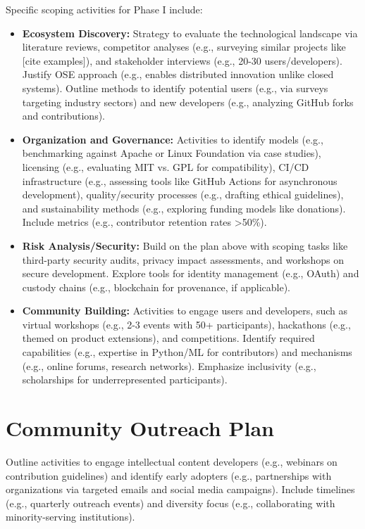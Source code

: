 \documentclass[11pt]{article}
\begin{document}
\noindent
Specific scoping activities for Phase I include:
\vspace{-3pt}
\begin{itemize}
    \item \textbf{Ecosystem Discovery:} Strategy to evaluate the technological landscape via literature reviews, competitor analyses (e.g., surveying similar projects like [cite examples]), and stakeholder interviews (e.g., 20-30 users/developers). Justify OSE approach (e.g., enables distributed innovation unlike closed systems). Outline methods to identify potential users (e.g., via surveys targeting industry sectors) and new developers (e.g., analyzing GitHub forks and contributions).
    \item \textbf{Organization and Governance:} Activities to identify models (e.g., benchmarking against Apache or Linux Foundation via case studies), licensing (e.g., evaluating MIT vs. GPL for compatibility), CI/CD infrastructure (e.g., assessing tools like GitHub Actions for asynchronous development), quality/security processes (e.g., drafting ethical guidelines), and sustainability methods (e.g., exploring funding models like donations). Include metrics (e.g., contributor retention rates >50\%).
    \item \textbf{Risk Analysis/Security:} Build on the plan above with scoping tasks like third-party security audits, privacy impact assessments, and workshops on secure development. Explore tools for identity management (e.g., OAuth) and custody chains (e.g., blockchain for provenance, if applicable).
    \item \textbf{Community Building:} Activities to engage users and developers, such as virtual workshops (e.g., 2-3 events with 50+ participants), hackathons (e.g., themed on product extensions), and competitions. Identify required capabilities (e.g., expertise in Python/ML for contributors) and mechanisms (e.g., online forums, research networks). Emphasize inclusivity (e.g., scholarships for underrepresented participants).
\end{itemize}


\section*{Community Outreach Plan}
\vspace{-3pt}
\noindent
Outline activities to engage intellectual content developers (e.g., webinars on contribution guidelines) and identify early adopters (e.g., partnerships with organizations via targeted emails and social media campaigns). Include timelines (e.g., quarterly outreach events) and diversity focus (e.g., collaborating with minority-serving institutions).
\vspace{-3pt}
\end{document}

